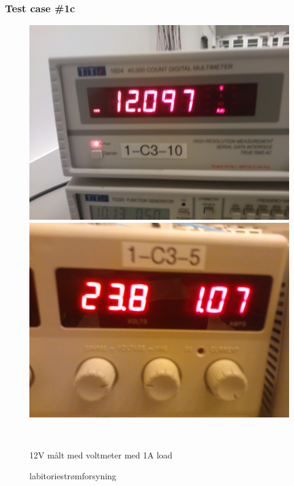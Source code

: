 \subsubsection{Test case \#1c}
\begin{figure}[htbp] \centering
\begin{minipage}[c]{0.48\textwidth} \centering
\includegraphics[width=1.00\textwidth]{billeder/12V_1A_meter.jpg} 
\end{minipage} \hfill
\begin{minipage}[c]{0.48\textwidth} \centering
\includegraphics[width=1.00\textwidth]{billeder/12V_1A_power.jpg} 
\end{minipage} \\ 
\begin{minipage}[b]{0.48\textwidth}
\caption{12V målt med voltmeter med 1A load} 
\label{fig:udgang_12V_1A}
\end{minipage} \hfill
\begin{minipage}[b]{0.48\textwidth}
\caption{labitoriestrømforsyning} 
\label{fig:forsyning_12V_1A}
\end{minipage}
\end{figure}
\newpage
